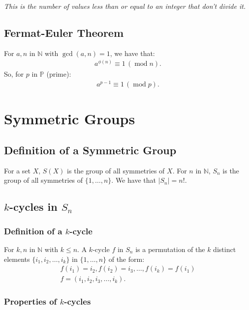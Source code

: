 \documentclass[a4paper, 12pt, twoside]{article}
\DeclareMathOperator{\Mod}{mod}
\DeclareMathOperator{\Gcd}{gcd}
\begin{document}
\vspace{\baselineskip}

\textit{This is the number of values less than or equal to an integer
      that don't divide it.}

\subsection{Fermat-Euler Theorem}

For $a, n$ in $\mathbb{N}$ with $\Gcd(a, n) = 1$, we have that:
\begin{align*}
      a^{\phi(n)} \equiv 1 \, (\Mod n).
\end{align*}
So, for $p$ in $\mathbb{P}$ (prime):
\begin{align*}
      a^{p - 1} \equiv 1 \, (\Mod p).
\end{align*}

\section{Symmetric Groups}

\subsection{Definition of a Symmetric Group}

For a set $X$, $S(X)$ is the group of all symmetries of $X$.
For $n$ in $\mathbb{N}$, $S_n$ is the group of all symmetries of
$\{1, \ldots, n\}$. We have that $|S_n| = n!$.

\subsection{$k$-cycles in $S_n$}

\subsubsection{Definition of a $k$-cycle}

For $k, n$ in $\mathbb{N}$ with $k \leq n$. A $k$-cycle $f$ in $S_n$
is a permutation of the $k$ distinct elements $\{i_1, i_2, \ldots,
      i_k\}$ in $\{1, \ldots, n\}$ of the form:
\begin{gather*}
      f(i_1) = i_2, f(i_2) = i_3, \ldots, f(i_k) = f(i_1) \\
      f = (i_1, i_2, i_3, \ldots, i_k).
\end{gather*}

\subsubsection{Properties of $k$-cycles}
\end{document}

